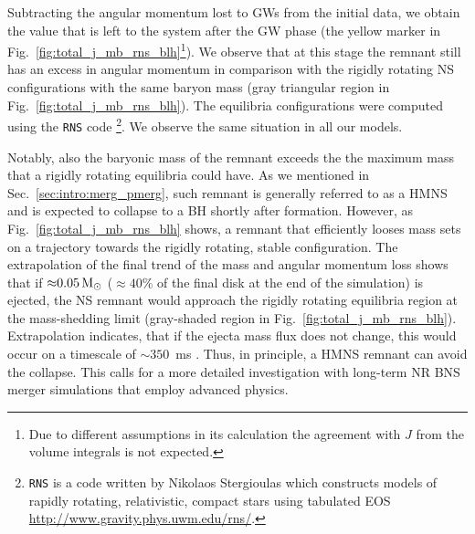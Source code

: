 Subtracting the angular momentum lost to \acp{GW} from the initial data, 
we obtain the value that is left to the system after the \ac{GW} phase 
(the yellow marker in Fig.~\ref{fig:total_j_mb_rns_blh}\footnote{
    Due to different assumptions in its calculation the agreement 
    with $J$ from the volume integrals is not expected.
}).
%
We observe that at this stage the remnant still has an excess in angular momentum
in comparison with the rigidly rotating \ac{NS} configurations with the same baryon mass 
(gray triangular region in Fig.~\ref{fig:total_j_mb_rns_blh}).
%
The equilibria configurations were computed using the \texttt{RNS} code \footnote{
    \texttt{RNS} is a code written by Nikolaos Stergioulas which constructs 
    models of rapidly rotating, relativistic, compact stars using tabulated 
    \ac{EOS} \url{http://www.gravity.phys.uwm.edu/rns/}.
}.
%
We observe the same situation in all our models.%

Notably, also the baryonic mass of the \pmerg{} remnant exceeds the 
the maximum mass that a rigidly rotating equilibria could have. 
As we mentioned in Sec.~\ref{sec:intro:merg_pmerg}, such remnant is generally referred 
to as a \ac{HMNS} \citep{Baumgarte:1999cq} 
and is expected to collapse to a \ac{BH} shortly after formation. 
%
However, as Fig.~\ref{fig:total_j_mb_rns_blh} shows, a remnant that efficiently 
looses mass sets on a trajectory towards the rigidly rotating, stable configuration. 
%
The extrapolation of the final trend of the mass and angular momentum loss shows that 
if ${\approx}0.05\,{\text{M}_{\odot}}$ (${\approx}40$\% of the final disk at the end of the simulation) is 
ejected, the \ac{NS} remnant would approach the rigidly rotating equilibria region 
at the mass-shedding limit (gray-shaded region in Fig.~\ref{fig:total_j_mb_rns_blh}). 
%
Extrapolation indicates, that if the ejecta mass flux does 
not change, this would occur on a timescale of ${\sim}350$~ms \pmerg{}.
%
Thus, in principle, a \ac{HMNS} remnant can avoid the collapse. 
This calls for a more detailed investigation with long-term \ac{NR} \ac{BNS} 
merger simulations that employ advanced physics.


